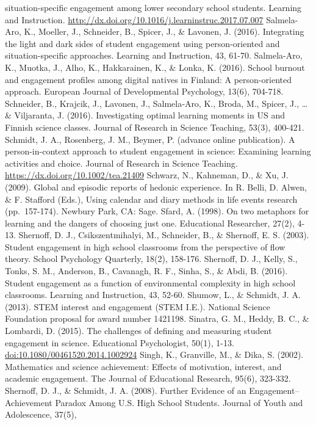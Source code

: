 \documentclass[]{msu-thesis}
\theoremstyle{definition}
\theoremstyle{definition}
\theoremstyle{definition}
\theoremstyle{remark}
\begin{document}
situation-specific engagement among lower secondary school students.
Learning and Instruction.
\url{http://dx.doi.org/10.1016/j.learninstruc.2017.07.007} Salmela-Aro,
K., Moeller, J., Schneider, B., Spicer, J., \& Lavonen, J. (2016).
Integrating the light and dark sides of student engagement using
person-oriented and situation-specific approaches. Learning and
Instruction, 43, 61-70. Salmela-Aro, K., Muotka, J., Alho, K.,
Hakkarainen, K., \& Lonka, K. (2016). School burnout and engagement
profiles among digital natives in Finland: A person-oriented approach.
European Journal of Developmental Psychology, 13(6), 704-718. Schneider,
B., Krajcik, J., Lavonen, J., Salmela‐Aro, K., Broda, M., Spicer, J.,
\ldots{} \& Viljaranta, J. (2016). Investigating optimal learning
moments in US and Finnish science classes. Journal of Research in
Science Teaching, 53(3), 400-421. Schmidt, J. A., Rosenberg, J. M.,
Beymer, P. (advance online publication). A person-in-context approach to
student engagement in science: Examining learning activities and choice.
Journal of Research in Science Teaching.
\url{https://dx.doi.org/10.1002/tea.21409} Schwarz, N., Kahneman, D., \&
Xu, J. (2009). Global and episodic reports of hedonic experience. In R.
Belli, D. Alwen, \& F. Stafford (Eds.), Using calendar and diary methods
in life events research (pp.~157-174). Newbury Park, CA: Sage. Sfard, A.
(1998). On two metaphors for learning and the dangers of choosing just
one. Educational Researcher, 27(2), 4-13. Shernoff, D. J.,
Csikszentmihalyi, M., Schneider, B., \& Shernoff, E. S. (2003). Student
engagement in high school classrooms from the perspective of flow
theory. School Psychology Quarterly, 18(2), 158-176. Shernoff, D. J.,
Kelly, S., Tonks, S. M., Anderson, B., Cavanagh, R. F., Sinha, S., \&
Abdi, B. (2016). Student engagement as a function of environmental
complexity in high school classrooms. Learning and Instruction, 43,
52-60. Shumow, L., \& Schmidt, J. A. (2013). STEM interest and
engagement (STEM I.E.). National Science Foundation proposal for award
number 1421198. Sinatra, G. M., Heddy, B. C., \& Lombardi, D. (2015).
The challenges of defining and measuring student engagement in science.
Educational Psychologist, 50(1), 1-13.
\url{doi:10.1080/00461520.2014.1002924} Singh, K., Granville, M., \&
Dika, S. (2002). Mathematics and science achievement: Effects of
motivation, interest, and academic engagement. The Journal of
Educational Research, 95(6), 323-332. Shernoff, D. J., \& Schmidt, J. A.
(2008). Further Evidence of an Engagement--Achievement Paradox Among
U.S. High School Students. Journal of Youth and Adolescence, 37(5),
\end{document}
